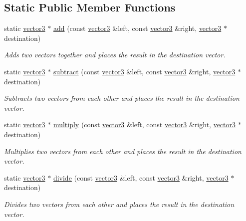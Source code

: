 \subsection*{Static Public Member Functions}
\begin{DoxyCompactItemize}
\item 
static \hyperlink{classflounder_1_1vector3}{vector3} $\ast$ \hyperlink{classflounder_1_1vector3_acd122d18a7cf02312f1f1b661208c9e3}{add} (const \hyperlink{classflounder_1_1vector3}{vector3} \&left, const \hyperlink{classflounder_1_1vector3}{vector3} \&right, \hyperlink{classflounder_1_1vector3}{vector3} $\ast$destination)
\begin{DoxyCompactList}\small\item\em Adds two vectors together and places the result in the destination vector. \end{DoxyCompactList}\item 
static \hyperlink{classflounder_1_1vector3}{vector3} $\ast$ \hyperlink{classflounder_1_1vector3_ad9f3c604d2f5956b22b9a1e636bfbd48}{subtract} (const \hyperlink{classflounder_1_1vector3}{vector3} \&left, const \hyperlink{classflounder_1_1vector3}{vector3} \&right, \hyperlink{classflounder_1_1vector3}{vector3} $\ast$destination)
\begin{DoxyCompactList}\small\item\em Subtracts two vectors from each other and places the result in the destination vector. \end{DoxyCompactList}\item 
static \hyperlink{classflounder_1_1vector3}{vector3} $\ast$ \hyperlink{classflounder_1_1vector3_a7b9eeceab7ad72fca3389035161a466e}{multiply} (const \hyperlink{classflounder_1_1vector3}{vector3} \&left, const \hyperlink{classflounder_1_1vector3}{vector3} \&right, \hyperlink{classflounder_1_1vector3}{vector3} $\ast$destination)
\begin{DoxyCompactList}\small\item\em Multiplies two vectors from each other and places the result in the destination vector. \end{DoxyCompactList}\item 
static \hyperlink{classflounder_1_1vector3}{vector3} $\ast$ \hyperlink{classflounder_1_1vector3_a533eb1012db36c85457da15ee9bf735b}{divide} (const \hyperlink{classflounder_1_1vector3}{vector3} \&left, const \hyperlink{classflounder_1_1vector3}{vector3} \&right, \hyperlink{classflounder_1_1vector3}{vector3} $\ast$destination)
\begin{DoxyCompactList}\small\item\em Divides two vectors from each other and places the result in the destination vector. \end{DoxyCompactList}\item 

\end{DoxyCompactItemize}
